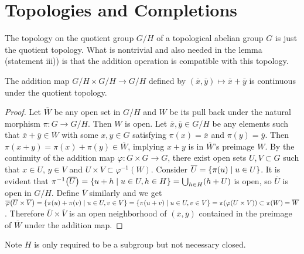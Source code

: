 \documentclass{note}
\begin{document}
\section*{Topologies and Completions}



The topology on the quotient group $G/H$ of a topological abelian group $G$ is
just the quotient topology. What is nontrivial and also needed in the lemma
(statement iii)) is that the addition operation is compatible with this
topology.

\begin{lemma*}
  The addition map $G/H \times G/H \to G/H$ defined by $(\bar{x},\bar{y}) \mapsto
    \bar{x}+\bar{y}$ is continuous under the quotient topology.
\end{lemma*}

\begin{proof}
  Let $\overline{W}$ be any open set in $G/H$ and $W$ be its pull back under the
  natural morphism $\pi\colon G \to G/H$. Then $W$ is open. Let $\overline{x},
    \overline{y} \in G/H$ be any elements such that $\overline{x} + \overline{y}
    \in \overline{W}$ with some $x, y \in G$ satisfying $\pi(x) = \overline{x}$ and
  $\pi(y) = \overline{y}$. Then $\pi(x + y) = \pi(x) + \pi(y) \in \overline{W}$,
  implying $x + y$ is in $\overline{W}$'s preimage $W$. By the continuity of the
  addition map $\varphi\colon G \times G \to G$, there exist open sets $U,V
    \subset G$ such that $x\in U$, $y\in V$ and $U\times V \subset
    \varphi^{-1}(W)$. Consider $\overline{U} = \setbuilder{\pi(u)}{u \in U}$. It is
  evident that $\pi^{-1}\left(\overline{U}\right) = \setbuilder{u+h}{u \in U, h
      \in H} = \bigcup_{h\in H}(h+U)$ is open, so $\overline{U}$ is open in $G/H$.
  Define $\overline{V}$ similarly and we get
  $\overline\varphi\left(\overline{U}\times\overline{V}\right) =
    \setbuilder{\pi(u)+\pi(v)}{u\in U, v\in V} = \setbuilder{\pi(u+v)}{u\in U, v\in
      V} = \pi\left(\varphi\left(U\times V\right)\right) \subset \pi(W) =
    \overline{W}$. Therefore $\overline{U} \times \overline{V}$ is an open
  neighborhood of $\left(\overline{x}, \overline{y}\right)$ contained in the
  preimage of $\overline{W}$ under the addition map.
\end{proof}

\begin{remark*}
  Note $H$ is only required to be a subgroup but not necessary closed.
\end{remark*}
\end{document}
